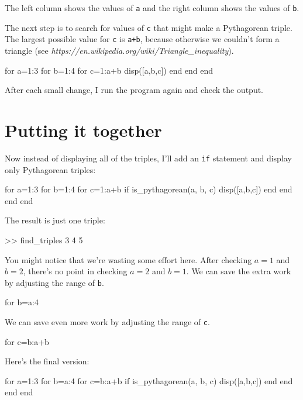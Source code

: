 The left column shows the values of {\tt a} and the right column shows the values of {\tt b}.

The next step is to search for values of {\tt c} that might make a Pythagorean triple.  The largest possible value for {\tt c} is {\tt a+b}, because otherwise we couldn't form a triangle (see \emph{https://en.wikipedia.org/wiki/Triangle_inequality}).

\begin{code}
for a=1:3
    for b=1:4
        for c=1:a+b
            disp([a,b,c])
        end
    end
end
\end{code}

After each small change, I run the program again and check the output.

\section{Putting it together}

Now instead of displaying all of the triples, I'll add an {\tt if} statement and display only Pythagorean triples:

\begin{code}
for a=1:3
    for b=1:4
        for c=1:a+b
            if is_pythagorean(a, b, c)
                disp([a,b,c])
            end
        end
    end
end
\end{code}

The result is just one triple:

\begin{code}
>> find_triples
     3     4     5
\end{code}

You might notice that we're wasting some effort here.
After checking $a=1$ and $b=2$, there's no point in checking
$a=2$ and $b=1$.  We can save the extra work by adjusting the
range of {\tt b}.

\begin{code}
for b=a:4
\end{code}

We can save even more work by adjusting the range of {\tt c}.

\begin{code}
for c=b:a+b
\end{code}

Here's the final version:

\begin{code}
for a=1:3
    for b=a:4
        for c=b:a+b
            if is_pythagorean(a, b, c)
                disp([a,b,c])
            end
        end
    end
end
\end{code}

